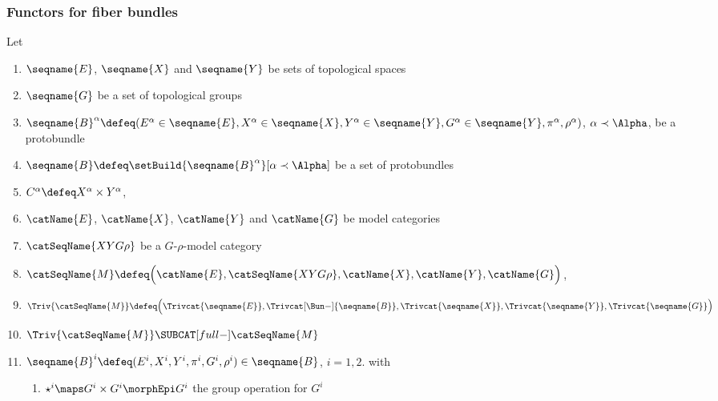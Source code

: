 \documentclass{article}
\begin{document}
\subsubsection{Functors for fiber bundles}

\begin{definition}
{
  \showlabelsinline
  \label{def:BunLCS}
}
Let
\begin{enumerate}
\item
$\seqname{E}$, $\seqname{X}$ and $\seqname{Y}$ be sets of
topological spaces

\item
$\seqname{G}$ be a set of topological groups

\item
$
  \seqname{B}^\alpha \defeq
  (
    E^\alpha \in \seqname{E},
    X^\alpha \in \seqname{X},
    Y^\alpha \in \seqname{Y},
    G^\alpha \in \seqname{Y},
    \pi^\alpha,
    \rho^\alpha
  )
$,
$\alpha \prec \Alpha$, be a protobundle

\item
$\seqname{B} \defeq \setBuild{{\seqname{B}^\alpha}}[\alpha \prec \Alpha]$
be a set of protobundles

\item
$C^\alpha \defeq X^\alpha \times Y^\alpha$,

\item
$\catName{E}$, $\catName{X}$, $\catName{Y}$ and $\catName{G}$ be model
categories

\item
$\catSeqName{XYG\rho}$ be a $G$-$\rho$-model category

\item
$
  \catSeqName{M} \defeq
   \Bigl  (
      \catName{E},
      \catSeqName{XYG\rho},
      \catName{X},
      \catName{Y},
      \catName{G}
   \Bigr  )
$,

\item
$
  \Triv{\catSeqName{M}} \defeq
    \Bigl  (
      \Trivcat{\seqname{E}},
      \Trivcat[\Bun-]{\seqname{B}},
      \Trivcat{\seqname{X}},
      \Trivcat{\seqname{Y}},
      \Trivcat{\seqname{G}}
    \Bigr  )
$

\item
$\Triv{\catSeqName{M}} \SUBCAT[full-] \catSeqName{M}$
\item
$
  \seqname{B}^i \defeq
  (
    E^i,
    X^i,
    Y^i,
    \pi^i,
    G^i,
    \rho^i
  )
  \in \seqname{B}
$,
$i=1,2$.
with
\begin{enumerate}
\item
$\star^i \maps G^i \times G^i \morphEpi G^i$ the group operation for $G^i$


\end{enumerate}
\end{enumerate}
\end{definition}
\end{document}
